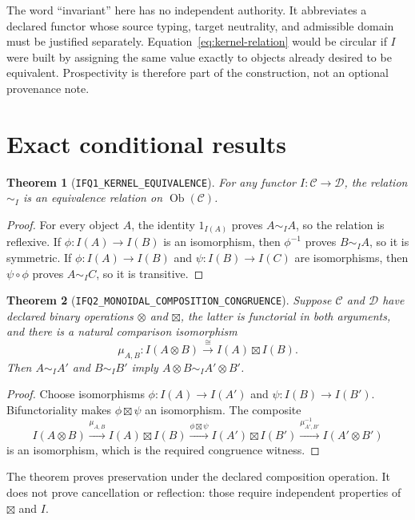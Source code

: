 \documentclass[11pt]{article}
\newtheorem{theorem}{Theorem}
\newcommand{\EqI}{\mathrel{\sim_I}}
\begin{document}
The word ``invariant'' here has no independent authority.  It abbreviates a
declared functor whose source typing, target neutrality, and admissible domain
must be justified separately.  Equation~\eqref{eq:kernel-relation} would be
circular if \(I\) were built by assigning the same value exactly to objects
already desired to be equivalent.  Prospectivity is therefore part of the
construction, not an optional provenance note.

\section{Exact conditional results}

\begin{theorem}[\texttt{IFQ1\_KERNEL\_EQUIVALENCE}]
For any functor \(I:\mathcal C\to\mathcal D\), the relation \(\EqI\) is an
equivalence relation on \(\operatorname{Ob}(\mathcal C)\).
\end{theorem}
\begin{proof}
For every object \(A\), the identity \(1_{I(A)}\) proves \(A\EqI A\), so the
relation is reflexive.  If \(\phi:I(A)\to I(B)\) is an isomorphism, then
\(\phi^{-1}\) proves \(B\EqI A\), so it is symmetric.  If
\(\phi:I(A)\to I(B)\) and \(\psi:I(B)\to I(C)\) are isomorphisms, then
\(\psi\circ\phi\) proves \(A\EqI C\), so it is transitive.
\end{proof}

\begin{theorem}[\texttt{IFQ2\_MONOIDAL\_COMPOSITION\_CONGRUENCE}]
Suppose \(\mathcal C\) and \(\mathcal D\) have declared binary operations
\(\otimes\) and \(\boxtimes\), the latter is functorial in both arguments, and
there is a natural comparison isomorphism
\[
  \mu_{A,B}:I(A\otimes B)\xrightarrow{\cong} I(A)\boxtimes I(B).
\]
Then \(A\EqI A'\) and \(B\EqI B'\) imply
\(A\otimes B\EqI A'\otimes B'\).
\end{theorem}
\begin{proof}
Choose isomorphisms \(\phi:I(A)\to I(A')\) and
\(\psi:I(B)\to I(B')\).  Bifunctoriality makes
\(\phi\boxtimes\psi\) an isomorphism.  The composite
\[
 I(A\otimes B)
 \xrightarrow{\mu_{A,B}}
 I(A)\boxtimes I(B)
 \xrightarrow{\phi\boxtimes\psi}
 I(A')\boxtimes I(B')
 \xrightarrow{\mu_{A',B'}^{-1}}
 I(A'\otimes B')
\]
is an isomorphism, which is the required congruence witness.
\end{proof}

The theorem proves preservation under the declared composition operation.  It
does not prove cancellation or reflection: those require independent
properties of \(\boxtimes\) and \(I\).
\end{document}
